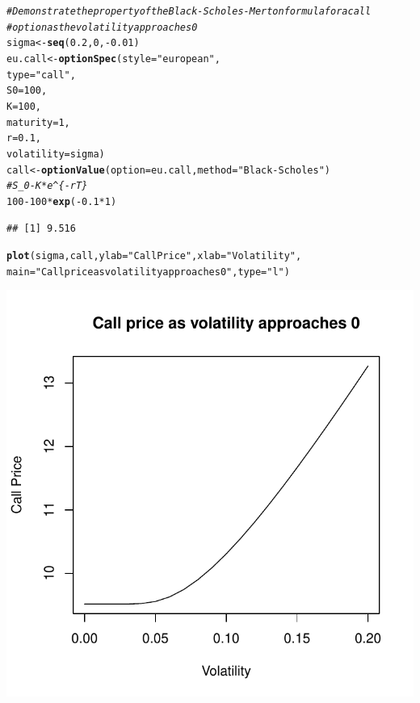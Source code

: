 \documentclass{article}\usepackage[]{graphicx}\usepackage[]{color}
\makeatletter
\def\maxwidth{ %
  \ifdim\Gin@nat@width>\linewidth
    \linewidth
  \else
    \Gin@nat@width
  \fi
}
\newcommand{\hlstr}[1]{\textcolor[rgb]{0.192,0.494,0.8}{#1}}%
\newcommand{\hlcom}[1]{\textcolor[rgb]{0.678,0.584,0.686}{\textit{#1}}}%
\newcommand{\hlkwd}[1]{\textcolor[rgb]{0.737,0.353,0.396}{\textbf{#1}}}%
\newenvironment{kframe}{%
 \def\at@end@of@kframe{}%
 \ifinner\ifhmode%
  \def\at@end@of@kframe{\end{minipage}}%
  \begin{minipage}{\columnwidth}%
 \fi\fi%
 \def\FrameCommand##1{\hskip\@totalleftmargin \hskip-\fboxsep
 \colorbox{shadecolor}{##1}\hskip-\fboxsep
     \hskip-\linewidth \hskip-\@totalleftmargin \hskip\columnwidth}%
 \MakeFramed {\advance\hsize-\width
   \@totalleftmargin\z@ \linewidth\hsize
   \@setminipage}}%
 {\par\unskip\endMakeFramed%
 \at@end@of@kframe}
\newenvironment{knitrout}{}{} %
\makeatother
\begin{document}
\begin{knitrout}
\color{fgcolor}\begin{kframe}
\begin{alltt}
\hlcom{# Demonstrate the property of the Black-Scholes-Merton formula for a call }
\hlcom{# option as the volatility approaches 0}
sigma <- \hlkwd{seq}(0.2, 0, -0.01)
eu.call <- \hlkwd{optionSpec}(style = \hlstr{"european"}, 
                      type = \hlstr{"call"}, 
                      S0 = 100,
                      K = 100,
                      maturity = 1, 
                      r = 0.1, 
                      volatility = sigma)
call <- \hlkwd{optionValue}(option = eu.call, method = \hlstr{"Black-Scholes"})
\hlcom{# S_0 - K * e^\{-r T\}}
100 - 100 * \hlkwd{exp}(-0.1 * 1)
\end{alltt}
\begin{verbatim}
## [1] 9.516
\end{verbatim}
\begin{alltt}
\hlkwd{plot}(sigma, call, ylab=\hlstr{"Call Price"}, xlab=\hlstr{"Volatility"}, 
     main=\hlstr{"Call price as volatility approaches 0"}, type = \hlstr{"l"})
\end{alltt}
\end{kframe}
\includegraphics[width=\maxwidth]{figure/unnamed-chunk-3} 

\end{knitrout}
\end{document}
